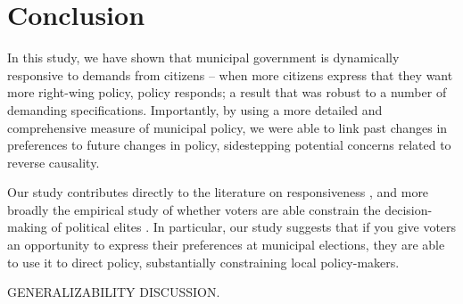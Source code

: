 \documentclass[a4paper,12pt]{article}
\begin{document}
\section*{Conclusion}

In this study, we have shown that municipal government is dynamically responsive to demands from citizens -- when more citizens express that they want more right-wing policy, policy responds; a result that was robust to a number of demanding specifications. Importantly, by using a more detailed and comprehensive measure of municipal policy, we were able to link past changes in preferences to future changes in policy, sidestepping potential concerns related to reverse causality. 


Our study contributes directly to the literature on responsiveness \citep{tausanovitch2014representation}, and more broadly the empirical study of whether voters are able constrain the decision-making of political elites \citep{berry2009imperfect}. In particular, our study suggests that if you give voters an opportunity to express their preferences at municipal elections, they are able to use it to direct policy, substantially constraining local policy-makers.

GENERALIZABILITY DISCUSSION.




\onehalfspacing



\clearpage

\renewcommand{\thesubsection}{\Alph{subsection}}
\renewcommand{\thetable}{\Alph{subsection}\arabic{table}}
\renewcommand{\thefigure}{\Alph{subsection}\arabic{figure}}
\end{document}
